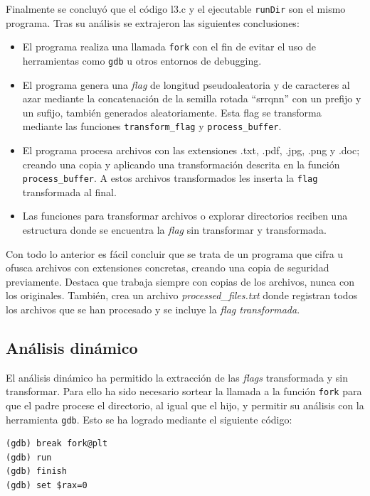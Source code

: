\documentclass[]{article}
\begin{document}
Finalmente se concluyó que el código l3.c y el ejecutable \texttt{runDir} son
el mismo programa. Tras su análisis se extrajeron las siguientes conclusiones:
\begin{itemize}
    \item El programa realiza una llamada \texttt{fork} con el fin de evitar el
    uso de herramientas como \texttt{gdb} u otros entornos de debugging.
    \item El programa genera una \textit{flag} de longitud pseudoaleatoria y de
    caracteres al azar mediante la concatenación de la semilla rotada
    ``srrqnn'' con un prefijo y un sufijo, también generados aleatoriamente.
    Esta flag se transforma mediante las funciones \texttt{transform\_flag} y
    \texttt{process\_buffer}.
    \item El programa procesa archivos con las extensiones .txt, .pdf, .jpg,
    .png y .doc; creando una copia y aplicando una transformación descrita en
    la función \texttt{process\_buffer}. A estos archivos transformados les
    inserta la \texttt{flag} transformada al final.
    \item Las funciones para transformar archivos o explorar directorios
    reciben una estructura donde se encuentra la \textit{flag} sin transformar
    y transformada.
\end{itemize}

Con todo lo anterior es fácil concluir que se trata de un programa que cifra u
ofusca archivos con extensiones concretas, creando una copia de seguridad
previamente. Destaca que trabaja siempre con copias de los archivos, nunca con
los originales. También, crea un archivo \textit{processed\_files.txt} donde
registran todos los archivos que se han procesado y se incluye la \textit{flag
transformada}.

\subsection{Análisis dinámico}
\label{subsec:analisis-dinámico-1}

El análisis dinámico ha permitido la extracción de las \textit{flags}
transformada y sin transformar. Para ello ha sido necesario sortear la llamada
a la función \texttt{fork} para que el padre procese el directorio, al igual
que el hijo, y permitir su análisis con la herramienta \texttt{gdb}. Esto se ha
logrado mediante el siguiente código:

\newpage
\begin{lstlisting}[caption=Instrucciones en gdb para esquivar la llamada fork]
(gdb) break fork@plt
(gdb) run
(gdb) finish
(gdb) set $rax=0
\end{lstlisting}
\end{document}
